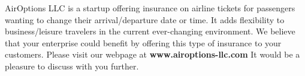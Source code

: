 \documentclass[10pt,stdletter,dateno,sigleft]{newlfm} %
\begin{document}
\begin{newlfm}


  AirOptions LLC is a startup offering insurance on airline tickets for
  passengers wanting to change their arrival/departure date or time.
  It adds flexibility to business/leisure travelers in the current
  ever-changing environment. 
  We believe that your enterprise could benefit by offering this type
  of insurance to your customers. Please visit our webpage at
  {\bf www.airoptions-llc.com} 
\vskip 5mm
\noindent
It would be a pleasure to discuss with you further. 


\end{newlfm}
\end{document}
